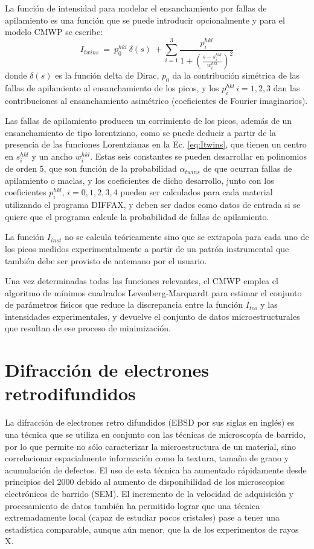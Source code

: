 La función de intensidad para modelar el ensanchamiento por fallas de apilamiento es una función que se puede introducir opcionalmente y para el modelo CMWP se escribe\cite{Ribarik2008}:
\begin{equation}
  I_{twins} \ = \ p_0^{hkl} \ \delta(s) \ + \sum_{i=1}^{3} \frac{p_{i}^{hkl}}{1+\left( \frac{s - s_i^{hkl}}{w_i^{hkl}} \right)^2}
  \label{eq:Itwins}
\end{equation}
\noindent
donde $\delta(s)$ es la función delta de Dirac, $p_0$ da la contribución simétrica de las fallas de apilamiento al ensanchamiento de los picos, y los $p_i^{hkl}\,i=1,2,3$ dan las contribuciones al ensanchamiento asimétrico (coeficientes de Fourier imaginarios).

Las fallas de apilamiento producen un corrimiento de los picos, además de un ensanchamiento de tipo lorentziano, como se puede deducir a partir de la presencia de las funciones Lorentzianas en la Ec. \ref{eq:Itwins}, que tienen un centro en $s_i^{hkl}$ y un ancho $w_i^{hkl}$.
Estas seis constantes se pueden desarrollar en polinomios de orden 5, que son función de la probabilidad $\alpha_{twins}$ de que ocurran fallas de apilamiento o maclas\cite{Ribarik2008}, y los coeficientes de dicho desarrollo, junto con los coeficientes $p_i^{hkl},\,i=0,1,2,3,4$ pueden ser calculados para cada material utilizando el programa DIFFAX\cite{Treacy1991}, y deben ser dados como datos de entrada si se quiere que el programa calcule la probabilidad de fallas de apilamiento.

La función $I_{inst}$ no se calcula teóricamente sino que se extrapola para cada uno de los picos medidos experimentalmente a partir de un patrón instrumental que también debe ser provisto de antemano por el usuario.

Una vez determinadas todas las funciones relevantes, el CMWP emplea el algoritmo de mínimos cuadrados Levenberg-Marquardt para estimar el conjunto de parámetros físicos que reduce la discrepancia entre la función $I_{teo}$ y las intensidades experimentales, y devuelve el conjunto de datos microestructurales que resultan de ese proceso de minimización.

 \section{Difracción de electrones retrodifundidos}\label{S:EBSD}
La difracción de electrones retro difundidos (EBSD por sus siglas en inglés) es una técnica que se utiliza en conjunto con las técnicas de microscopía de barrido, por lo que permite no sólo caracterizar la microestructura de un material, sino correlacionar espacialmente información como la textura, tamaño de grano y acumulación de defectos.
El uso de esta técnica ha aumentado rápidamente desde principios del 2000 debido al aumento de disponibilidad de los microscopios electrónicos de barrido (SEM). El incremento de la velocidad de adquisición y procesamiento de datos también ha permitido lograr que una técnica extremadamente local (capaz de estudiar pocos cristales) pase a tener una estadística comparable, aunque aún menor, que la de los experimentos de rayos X.

